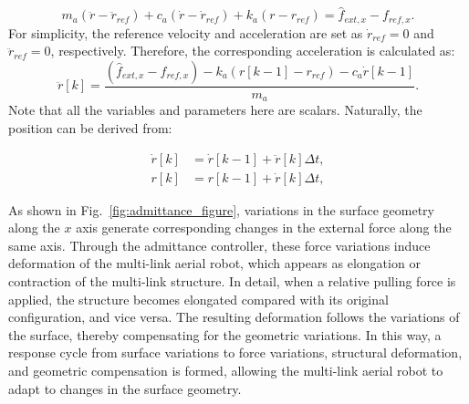 \begin{equation}
\label{eq:admittance control2}
    m_a(\ddot{r}-\ddot{r}_{ref})+c_a(\dot{r}-\dot{r}_{ref})+k_a(r-r_{ref})=\hat{f}_{ext,x}-f_{ref,x}.
\end{equation}
For simplicity, the reference velocity and acceleration are set as $\dot{r}_{ref}=0$ and $\ddot{r}_{ref}=0$, respectively. Therefore, the corresponding acceleration is calculated as:
\begin{equation}
\label{eq:difference method3}
\ddot{r}[k]=\frac{(\hat{f}_{ext,x}-f_{ref,x})-k_a(r[k-1]-r_{ref})-c_a\dot{r}[k-1]}{m_a}.
\end{equation}
Note that all the variables and parameters here are scalars. Naturally, the position can be derived from:

\begin{subequations}
\label{eq:difference method4}
\begin{align}
\dot{r}[k]&=\dot{r}[k-1]+\ddot{r}[k]\Delta t,\\[2pt]
r[k]&=r[k-1]+\dot{r}[k]\Delta t,
\end{align}
\end{subequations}





As shown in Fig.~\ref{fig:admittance_figure}, variations in the surface geometry along the $x$ axis generate corresponding changes in the external force along the same axis. Through the admittance controller, these force variations induce deformation of the multi-link aerial robot, which appears as elongation or contraction of the multi-link structure. In detail, when a relative pulling force is applied, the structure becomes elongated compared with its original configuration, and vice versa. The resulting deformation follows the variations of the surface, thereby compensating for the geometric variations. In this way, a response cycle from surface variations to force variations, structural deformation, and geometric compensation is formed, allowing the multi-link aerial robot to adapt to changes in the surface geometry.



